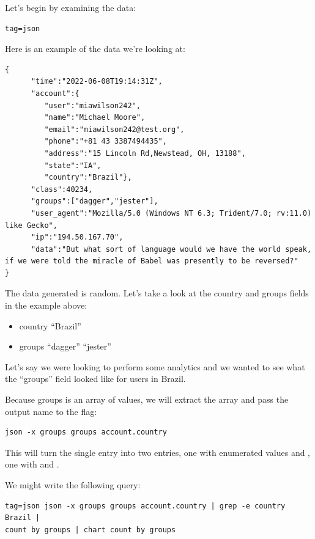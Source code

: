 Let's begin by examining the data:

\begin{Verbatim}
tag=json
\end{Verbatim}

Here is an example of the data we're looking at:

\begin{Verbatim}[breaklines=true]
{
      "time":"2022-06-08T19:14:31Z",
      "account":{
         "user":"miawilson242",
         "name":"Michael Moore",
         "email":"miawilson242@test.org",
         "phone":"+81 43 3387494435",
         "address":"15 Lincoln Rd,Newstead, OH, 13188", 
         "state":"IA",
         "country":"Brazil"},
      "class":40234,
      "groups":["dagger","jester"],
      "user_agent":"Mozilla/5.0 (Windows NT 6.3; Trident/7.0; rv:11.0) like Gecko",
      "ip":"194.50.167.70",
      "data":"But what sort of language would we have the world speak, if we were told the miracle of Babel was presently to be reversed?"
}
\end{Verbatim}

The data generated is random. Let's take a look at the country and groups fields in the example above:

\begin{itemize}
\item country
\subitem ``Brazil''
\item groups
\subitem ``dagger''
\subitem ``jester''
\end{itemize}

Let's say we were looking to perform some analytics and we wanted to see
what the ``groups'' field looked like for users in Brazil. 

Because groups is an array of values, we will extract 
the array and pass the output name to the  flag:

\begin{Verbatim}
json -x groups groups account.country
\end{Verbatim}

This will turn the single entry into two entries, one with enumerated values  and
, one with  and . 

We might write the following query:

\begin{Verbatim}[breaklines=true]
tag=json json -x groups groups account.country | grep -e country Brazil |
count by groups | chart count by groups
\end{Verbatim}

